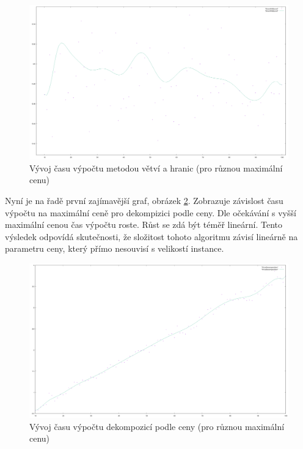 \documentclass[12pt,a4paper]{article}
\begin{document}
\begin{figure}[H]
\begin{center}
\includegraphics[width=\textwidth]{maxCost/BranchNBound}
\caption{Vývoj času výpočtu metodou větví a hranic (pro různou maximální cenu)}
\label{maxCost/BranchNBound}
\end{center}
\end{figure}

Nyní je na řadě první zajímavější graf, obrázek \ref{maxCost/PriceDecomposition}. Zobrazuje závislost času výpočtu na maximální ceně pro dekompizici podle ceny. Dle očekávání s vyšší maximální cenou čas výpočtu roste. Růst se zdá být téměř lineární. Tento výsledek odpovídá skutečnosti, že složitost tohoto algoritmu závisí lineárně na parametru ceny, který přímo nesouvisí s velikostí instance.

\begin{figure}[H]
\begin{center}
\includegraphics[width=\textwidth]{maxCost/PriceDecomposition}
\caption{Vývoj času výpočtu dekompozicí podle ceny (pro různou maximální cenu)}
\label{maxCost/PriceDecomposition}
\end{center}
\end{figure}
\end{document}
